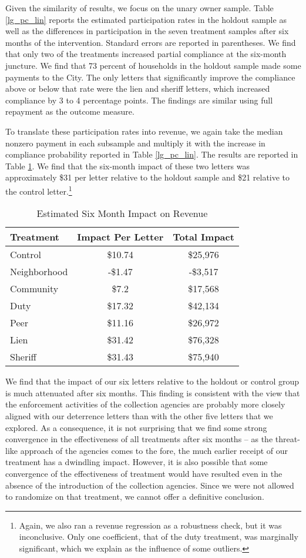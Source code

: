 \documentclass[12pt]{article}
\begin{document}
Given the similarity of results, we focus on the unary owner sample.  Table \ref{lg_pc_lin}
reports the estimated participation rates in the holdout sample as
well as the differences in participation in the seven treatment
samples after six months of the intervention. Standard errors
are reported in parentheses. We find that only two of the treatments
increased partial compliance at the six-month juncture.  We find that 73
percent of households in the holdout sample made some payments to the
City. The only letters that significantly improve the compliance above or below
that rate were the lien and sheriff letters, which increased
compliance by 3 to 4 percentage points. The findings are similar using
full repayment as the outcome measure.

To translate these participation rates into revenue, we again take the
median nonzero payment in each subsample and multiply it with
the increase in compliance probability reported in Table
\ref{lg_pc_lin}.  The results are reported in Table \ref{lg_rev}. We
find that the six-month impact of these two letters was approximately
\$31 per letter relative to the holdout sample and \$21 relative to
the control letter.\footnote{Again, we also ran a revenue regression as a 
robustness check, but it was inconclusive. Only one 
coefficient, that of the duty treatment, was marginally significant, which we
explain as the influence of some outliers.}

\begin{table}[htbp]
\caption{Estimated Six Month Impact on Revenue} \label{lg_rev}
\bigskip
\centering
\begin{tabular}{lcc}
  \hline
Treatment & Impact Per Letter & Total Impact \\ 
  \hline
Control & \$10.74 & \$25,976 \\ 
  Neighborhood & -\$1.47 & -\$3,517 \\ 
  Community & \$7.2 & \$17,568 \\ 
  Duty & \$17.32 & \$42,134 \\ 
  Peer & \$11.16 & \$26,972 \\ 
  Lien & \$31.42 & \$76,328 \\ 
  Sheriff & \$31.43 & \$75,940 \\ 
   \hline
\end{tabular}
\end{table}

We find that the impact of our six letters relative to the holdout or
control group is much attenuated after six months. This finding is
consistent with the view that the enforcement activities of the
collection agencies are probably more closely aligned with our
deterrence letters than with the other five letters that we
explored. As a consequence, it is not surprising that we find some
strong convergence in the effectiveness of all treatments after six
months -- as the threat-like approach of the agencies comes to the fore,
the much earlier receipt of our treatment has a dwindling impact.
However, it is also possible that some convergence of the
effectiveness of treatment would have resulted even in the absence of the
introduction of the collection agencies. Since we were not allowed to
randomize on that treatment, we cannot offer a definitive conclusion.
\end{document}

